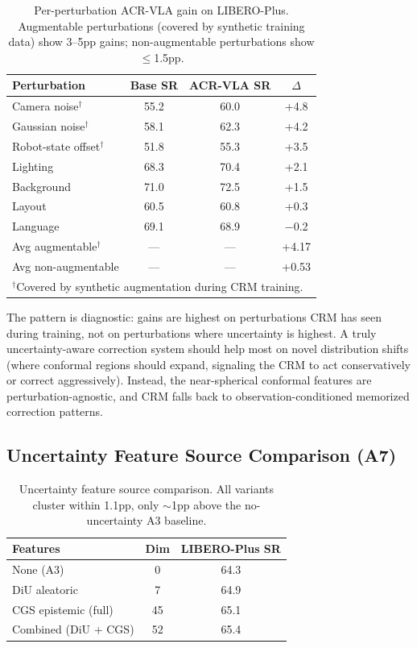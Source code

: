 \documentclass[letterpaper]{article}
\begin{document}
\begin{table}[h]
\centering
\caption{Per-perturbation ACR-VLA gain on LIBERO-Plus. Augmentable perturbations (covered by synthetic training data) show 3--5pp gains; non-augmentable perturbations show $\leq$1.5pp.}
\label{tab:perturbation}
\begin{tabular}{lccc}
\toprule
\textbf{Perturbation} & \textbf{Base SR} & \textbf{ACR-VLA SR} & \textbf{$\Delta$} \\
\midrule
Camera noise$^\dagger$ & 55.2 & 60.0 & +4.8 \\
Gaussian noise$^\dagger$ & 58.1 & 62.3 & +4.2 \\
Robot-state offset$^\dagger$ & 51.8 & 55.3 & +3.5 \\
\midrule
Lighting & 68.3 & 70.4 & +2.1 \\
Background & 71.0 & 72.5 & +1.5 \\
Layout & 60.5 & 60.8 & +0.3 \\
Language & 69.1 & 68.9 & $-$0.2 \\
\midrule
Avg augmentable$^\dagger$ & --- & --- & +4.17 \\
Avg non-augmentable & --- & --- & +0.53 \\
\bottomrule
\multicolumn{4}{l}{\small $^\dagger$Covered by synthetic augmentation during CRM training.}
\end{tabular}
\end{table}

The pattern is diagnostic: gains are highest on perturbations CRM has seen during training, not on perturbations where uncertainty is highest.
A truly uncertainty-aware correction system should help most on novel distribution shifts (where conformal regions should expand, signaling the CRM to act conservatively or correct aggressively).
Instead, the near-spherical conformal features are perturbation-agnostic, and CRM falls back to observation-conditioned memorized correction patterns.

\subsection{Uncertainty Feature Source Comparison (A7)}

\begin{table}[h]
\centering
\caption{Uncertainty feature source comparison. All variants cluster within 1.1pp, only $\sim$1pp above the no-uncertainty A3 baseline.}
\label{tab:a7}
\begin{tabular}{lcc}
\toprule
\textbf{Features} & \textbf{Dim} & \textbf{LIBERO-Plus SR} \\
\midrule
None (A3) & 0 & 64.3 \\
DiU aleatoric & 7 & 64.9 \\
CGS epistemic (full) & 45 & 65.1 \\
Combined (DiU + CGS) & 52 & 65.4 \\
\bottomrule
\end{tabular}
\end{table}
\end{document}
